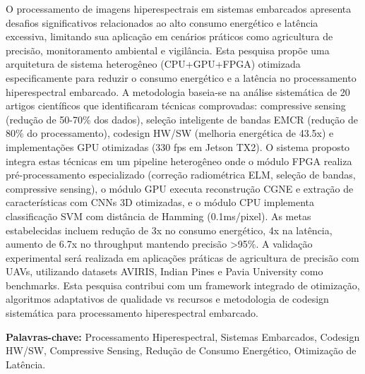 \documentclass[12pt,Final,Portugues]{tese-FT}
\begin{document}
\titlepage

\approvalpage



\begin{resumo}

O processamento de imagens hiperespectrais em sistemas embarcados apresenta desafios significativos relacionados ao alto consumo energético e latência excessiva, limitando sua aplicação em cenários práticos como agricultura de precisão, monitoramento ambiental e vigilância. Esta pesquisa propõe uma arquitetura de sistema heterogêneo (CPU+GPU+FPGA) otimizada especificamente para reduzir o consumo energético e a latência no processamento hiperespectral embarcado. A metodologia baseia-se na análise sistemática de 20 artigos científicos que identificaram técnicas comprovadas: compressive sensing (redução de 50-70\% dos dados), seleção inteligente de bandas EMCR (redução de 80\% do processamento), codesign HW/SW (melhoria energética de 43.5x) e implementações GPU otimizadas (330 fps em Jetson TX2). O sistema proposto integra estas técnicas em um pipeline heterogêneo onde o módulo FPGA realiza pré-processamento especializado (correção radiométrica ELM, seleção de bandas, compressive sensing), o módulo GPU executa reconstrução CGNE e extração de características com CNNs 3D otimizadas, e o módulo CPU implementa classificação SVM com distância de Hamming (0.1ms/pixel). As metas estabelecidas incluem redução de 3x no consumo energético, 4x na latência, aumento de 6.7x no throughput mantendo precisão >95\%. A validação experimental será realizada em aplicações práticas de agricultura de precisão com UAVs, utilizando datasets AVIRIS, Indian Pines e Pavia University como benchmarks. Esta pesquisa contribui com um framework integrado de otimização, algoritmos adaptativos de qualidade vs recursos e metodologia de codesign sistemática para processamento hiperespectral embarcado.

\textbf{Palavras-chave:} Processamento Hiperespectral, Sistemas Embarcados, Codesign HW/SW, Compressive Sensing, Redução de Consumo Energético, Otimização de Latência.
\end{resumo}
\end{document}
